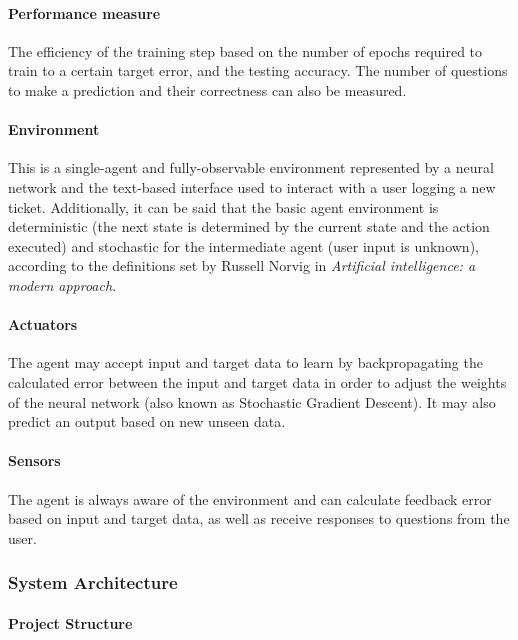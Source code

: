 \documentclass[letterpaper,12pt]{article}
\begin{document}
\paragraph{Performance measure}\label{sec:performance-measures} The efficiency of the training step based on the number of epochs required to train to a certain target error, and the testing accuracy. The number of questions to make a prediction and their correctness can also be measured.

\paragraph{Environment} This is a single-agent and fully-observable environment represented by a neural network and the text-based interface used to interact with a user logging a new ticket. Additionally, it can be said that the basic agent environment is deterministic (the next state is determined by the current state and the action executed) and stochastic for the intermediate agent (user input is unknown), according to the definitions set by Russell Norvig in \textit{Artificial intelligence: a modern approach}.

\paragraph{Actuators} The agent may accept input and target data to learn by backpropagating the calculated error between the input and target data in order to adjust the weights of the neural network (also known as Stochastic Gradient Descent). It may also predict an output based on new unseen data.

\paragraph{Sensors} The agent is always aware of the environment and can calculate feedback error based on input and target data, as well as receive responses to questions from the user.


\subsubsection{System Architecture}

\paragraph{Project Structure}
\end{document}
